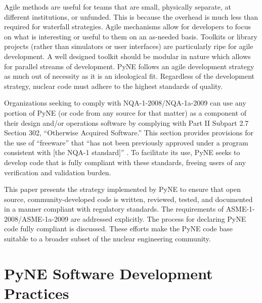 \documentclass{anstrans}
\begin{document}
Agile methods are useful for teams that are small, physically separate, at
different institutions, or unfunded. This is because the overhead is much 
less than required for waterfall strategies.  Agile mechanisms allow for developers
to focus on what is interesting or useful to them on an as-needed basis.
Toolkits or library projects (rather than simulators or user interfaces) are 
particularly ripe for agile development. A well designed toolkit should be 
modular in nature which allows for parallel streams of development.  
PyNE follows an agile development strategy as much out of necessity as it
is an ideological fit.  Regardless of the development strategy, nuclear code
must adhere to the highest standards of quality.

Organizations seeking to comply with NQA-1-2008/NQA-1a-2009 can use any portion
of PyNE (or code from any source for that matter) as a component of their
design and/or operations software by complying with Part II Subpart 2.7 Section
302, ``Otherwise Acquired Software.'' This section provides provisions for the
use of ``freeware'' that ``has not been previously approved under a program
consistent with [the NQA-1 standard]'' \cite{add}.  To facilitate its use, PyNE
seeks to develop code that is fully compliant with these standards, freeing users of
any verification and validation burden.

This paper presents the strategy implemented by PyNE to ensure that
open source, community-developed code is written, reviewed, tested, and
documented in a manner compliant with regulatory standards. The requirements of
ASME-1-2008/ASME-1a-2009 are addressed explicitly. The process for declaring
PyNE code fully compliant is discussed. These efforts make the PyNE code base suitable
to a broader subset of the nuclear engineering community.

\section{PyNE Software Development Practices}
\end{document}
